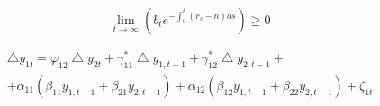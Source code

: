 \documentclass[12pt, a4paper]{article}
\begin{document}
\begin{equation}\label{nomer3}
\lim_{t \to \infty} (b_te^{-\int_0^t (r_s-n)ds})	\geqslant 0\tag{\ae\ae\ae}
\end{equation}



\begin{multline*}\label{nomer4}
\bigtriangleup y_{1t}=\varphi_{12}\bigtriangleup y_{2t}+\gamma^*_{11}\bigtriangleup y_{1,t-1}+\gamma^*_{12}\bigtriangleup y_{2,t-1}+\\+\alpha_{11}(\beta_{11}y_{1,t-1}+\beta_{21}y_{2,t-1}) +\alpha_{12}(\beta_{12}y_{1,t-1}+\beta_{22}y_{2,t-1})+\zeta_{1t}\tag{\ae\ae\ae\ae}
\end{multline*}


\def \a{\begin{pmatrix}
  1 & -\varphi_{12}  \\
  -\varphi_{21} & -1  \\
  
 \end{pmatrix}}
 \def \b{\begin{pmatrix}
\bigtriangleup y_{1t}	\\
\bigtriangleup y_{2t}
\end{pmatrix}}
\def \c{\begin{pmatrix}
   \gamma^*_{11}& \gamma^*_{12}  \\
  \gamma^*_{21} & \gamma^*_{22}  \\
  
 \end{pmatrix}}
 \def \d{\begin{pmatrix}
\bigtriangleup y_{1,t-1}	\\
\bigtriangleup y_{2,t-1}
\end{pmatrix}}
\def \e{\begin{pmatrix}
  \alpha_{11} & \alpha_{12} \\
  \alpha_{21} & \alpha_{22}  \\
  
 \end{pmatrix}}
 \def \f{\begin{pmatrix}
 \beta_{11} & \beta_{12} \\
  \beta_{21} & \beta_{22} \\
   \end{pmatrix}^T}
   \def \g{\begin{pmatrix}
 y_{1,t-1}	\\
 y_{2,t-1}
\end{pmatrix}}
\def \h{\begin{pmatrix}
\zeta_{1t}	\\
\zeta_{2t}
\end{pmatrix}}
\end{document}
